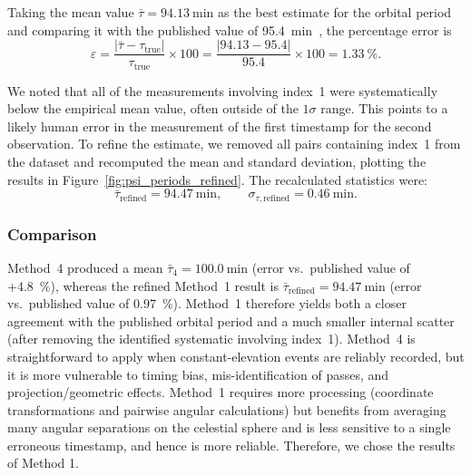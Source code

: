 \documentclass{article}
\begin{document}
Taking the mean value $\bar{\tau} = \SI{94.13}{\minute}$ as the best estimate for the orbital period and comparing it with the published value of \SI{95.4}{\minute}~\cite{n2yo_starlink3988}, the percentage error is
\[
\varepsilon = \frac{|\bar{\tau} - \tau_\text{true}|}{\tau_\text{true}} \times 100
           = \frac{|94.13 - 95.4|}{95.4} \times 100 = \SI{1.33}{\percent}.
\]

We noted that all of the measurements involving index~1 were systematically below the empirical mean value, often outside of the $1\sigma$ range. This points to a likely human error in the measurement of the first timestamp for the second observation. To refine the estimate, we removed all pairs containing index~1 from the dataset and recomputed the mean and standard deviation, plotting the results in Figure~\ref{fig:psi_periods_refined}. The recalculated statistics were:
\[
\bar{\tau}_{\text{refined}} = \SI{94.47}{\minute}, \qquad \sigma_{\tau,\text{refined}} = \SI{0.46}{\minute}.
\]

\subsubsection{Comparison}

Method~4 produced a mean $\bar{\tau}_{4}=\SI{100.0}{\minute}$ (error vs.\ published value of +\SI{4.8}{\percent}), whereas the refined Method~1 result is $\bar{\tau}_{\text{refined}}=\SI{94.47}{\minute}$ (error vs.\ published value of \SI{0.97}{\percent}). Method~1 therefore yields both a closer agreement with the published orbital period and a much smaller internal scatter (after removing the identified systematic involving index~1). Method~4 is straightforward to apply when constant-elevation events are reliably recorded, but it is more vulnerable to timing bias, mis-identification of passes, and projection/geometric effects. Method~1 requires more processing (coordinate transformations and pairwise angular calculations) but benefits from averaging many angular separations on the celestial sphere and is less sensitive to a single erroneous timestamp, and hence is more reliable. Therefore, we chose the results of Method 1.
\end{document}
